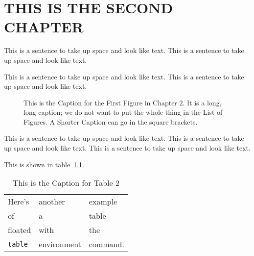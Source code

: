  
\chapter{THIS IS THE SECOND CHAPTER}
This is a sentence to take up space and look like text.
This is a sentence to take up space and look like text.
 
This is a sentence to take up space and look like text.
This is a sentence to take up space and look like text.

\begin{figure}
\centering
\vspace{2.0in}
\caption[A Shorter Caption for the List of Figures]
   {This is the Caption for the First Figure in Chapter 2.  It is a
    long, long caption; we do not want to put the whole thing in the
    List of Figures. A Shorter Caption can go in the square brackets.}
\end{figure}
 
This is a sentence to take up space and look like text.
This is a sentence to take up space and look like text.
This is a sentence to take up space and look like text.

This is shown in table~\ref{mytable}.  %
 
\begin{table}
\caption{This is the Caption for Table 2}
\label{mytable}        %
\begin{center}
\begin{tabular}{lll}
Here's       & another     & example  \\
of           & a           & table    \\
floated      & with        & the      \\
\verb+table+ & environment & command.
\end{tabular}
\end{center}
\end{table}
 
